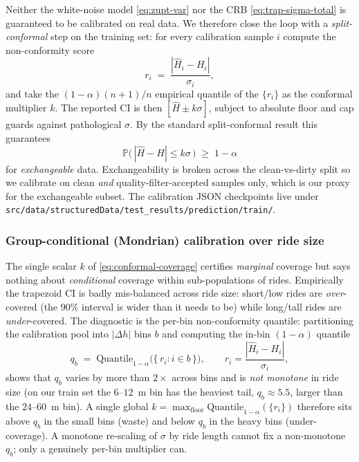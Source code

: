Neither the white-noise model \eqref{eq:zupt-var} nor the CRB
\eqref{eq:trap-sigma-total} is guaranteed to be calibrated on real data.
We therefore close the loop with a \emph{split-conformal} step on
the training set: for every calibration sample $i$ compute the
non-conformity score
\begin{equation}
  r_i \;=\; \frac{|\hat{H}_i - H_i|}{\sigma_i},
  \label{eq:nonconformity}
\end{equation}
and take the $(1-\alpha)(n+1)/n$ empirical quantile of the
$\{r_i\}$ as the conformal multiplier $k$. The reported CI is then
$[\hat{H}\pm k\sigma]$, subject to absolute floor and cap guards
against pathological $\sigma$. By the standard split-conformal
result this guarantees
\begin{equation}
  \mathbb{P}\bigl(\,|\hat{H}-H|\le k\sigma\,\bigr) \;\ge\; 1-\alpha
  \label{eq:conformal-coverage}
\end{equation}
for \emph{exchangeable} data. Exchangeability is broken across the
clean-vs-dirty split so we calibrate on clean \emph{and}
quality-filter-accepted samples only, which is our proxy for the
exchangeable subset. The calibration JSON checkpoints live under
\texttt{\small src/data/\allowbreak{}structuredData/\allowbreak{}test\_results/\allowbreak{}prediction/\allowbreak{}train/}.

\subsubsection{Group-conditional (Mondrian) calibration over ride size}
\label{sec:mondrian-conformal}

The single scalar $k$ of \eqref{eq:conformal-coverage} certifies
\emph{marginal} coverage but says nothing about \emph{conditional}
coverage within sub-populations of rides. Empirically the trapezoid CI
is badly mis-balanced across ride size: short/low rides are
\emph{over}-covered (the $90\%$ interval is wider than it needs to be)
while long/tall rides are \emph{under}-covered. The diagnostic is the
per-bin non-conformity quantile: partitioning the calibration pool into
$|\Delta h|$ bins $b$ and computing the in-bin $(1-\alpha)$ quantile
\begin{equation}
  q_b \;=\; \mathrm{Quantile}_{1-\alpha}\!\bigl(\{\,r_i : i \in b\,\}\bigr),
  \qquad r_i = \frac{|\hat H_i - H_i|}{\sigma_i},
  \label{eq:qbin}
\end{equation}
shows that $q_b$ varies by more than $2\times$ across bins and is
\emph{not monotone} in ride size (on our train set the $6$--$12$~m bin
has the heaviest tail, $q_b\!\approx\!5.5$, larger than the
$24$--$60$~m bin). A single global $k=\max_{\text{floor}}
\mathrm{Quantile}_{1-\alpha}(\{r_i\})$ therefore sits above $q_b$ in the
small bins (waste) and below $q_b$ in the heavy bins (under-coverage).
A monotone re-scaling of $\sigma$ by ride length cannot fix a
non-monotone $q_b$; only a genuinely per-bin multiplier can.

